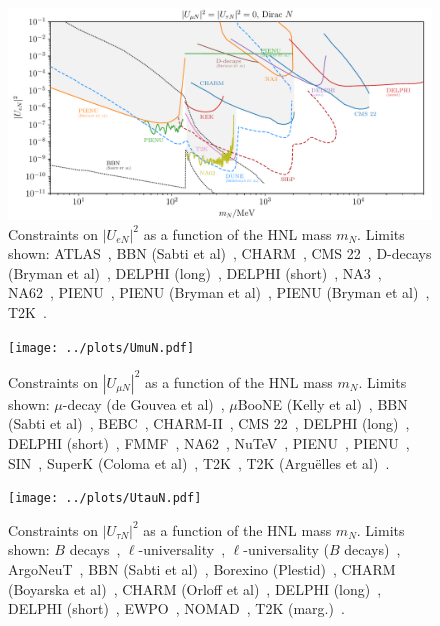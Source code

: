 \documentclass{revtex4-2}%
\begin{document}
%
\normalsize%


\begin{figure}[h!]%
\centering%
\includegraphics[width=1\textwidth]{../plots/UeN.pdf}%
\caption{Constraints on $|U_{e N}|^2$ as a function of the HNL mass $m_N$. Limits shown: ATLAS~\cite{ATLAS:2019kpx}, BBN (Sabti et al)~\cite{Sabti:2020yrt}, CHARM~\cite{CHARM:1985nku}, CMS 22~\cite{2201.05578}, D-decays (Bryman et al)~\cite{Bryman:2019bjg}, DELPHI (long)~\cite{DELPHI:1996qcc}, DELPHI (short)~\cite{DELPHI:1996qcc}, NA3~\cite{NA3:1986ahv}, NA62~\cite{NA62:2020mcv}, PIENU~\cite{Britton:1992xv}, PIENU (Bryman et al)~\cite{Bryman:2019bjg}, PIENU (Bryman et al)~\cite{Bryman:2019bjg}, T2K~\cite{T2K:2019jwa}.}%
\end{figure}

%


\begin{figure}[h!]%
\centering%
\texttt{[image: ../plots/UmuN.pdf]}%
\caption{Constraints on $|U_{\mu N}|^2$ as a function of the HNL mass $m_N$. Limits shown: $\mu$-decay (de Gouvea et al)~\cite{deGouvea:2015euy}, $\mu$BooNE (Kelly et al)~\cite{Kelly:2021xbv}, BBN (Sabti et al)~\cite{Sabti:2020yrt}, BEBC~\cite{WA66:1985mfx}, CHARM-II~\cite{CHARMII:1994jjr}, CMS 22~\cite{2201.05578}, DELPHI (long)~\cite{DELPHI:1996qcc}, DELPHI (short)~\cite{DELPHI:1996qcc}, FMMF~\cite{FMMF:1994yvb,}, NA62~\cite{NA62:2021bji}, NuTeV~\cite{NuTeV:1999kej}, PIENU~\cite{PIENU:2019usb}, PIENU~\cite{PIENU:2019usb}, SIN~\cite{Daum:1987bg}, SuperK (Coloma et al)~\cite{Coloma:2019htx}, T2K~\cite{T2K:2019jwa}, T2K (Argu\"elles et al)~\cite{Arguelles:2021dqn}.}%
\end{figure}

%


\begin{figure}[h!]%
\centering%
\texttt{[image: ../plots/UtauN.pdf]}%
\caption{Constraints on $|U_{\tau N}|^2$ as a function of the HNL mass $m_N$. Limits shown: $B$ decays~\cite{Cvetic:2017gkt}, $\ell$-universality~\cite{Fernandez-Martinez:2016lgt}, $\ell$-universality ($B$ decays)~\cite{Cvetic:2017gkt}, ArgoNeuT~\cite{ArgoNeuT:2021clc}, BBN (Sabti et al)~\cite{Sabti:2020yrt}, Borexino (Plestid)~\cite{Plestid:2020ssy}, CHARM (Boyarska et al)~\cite{Boiarska:2021yho}, CHARM (Orloff et al)~\cite{Orloff:2002de}, DELPHI (long)~\cite{DELPHI:1996qcc}, DELPHI (short)~\cite{DELPHI:1996qcc}, EWPO~\cite{Bolton:2019pcu}, NOMAD~\cite{NOMAD:2001eyx}, T2K (marg.)~\cite{T2K:2019jwa}.}%
\end{figure}

%
%
%
\end{document}
